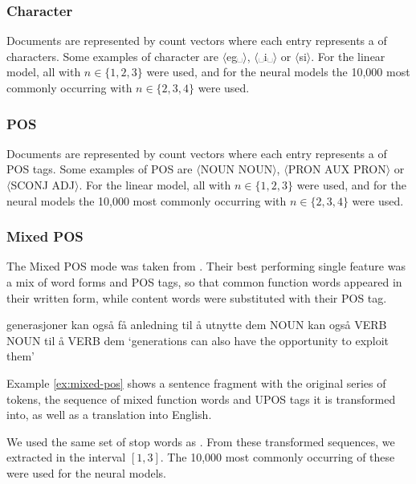 \subsubsection*{Character \ngrams}

Documents are represented by count vectors where each entry represents a
\ngram of characters. Some examples of character \ngrams are
$\langle$eg␣$\rangle$, $\langle$␣i␣$\rangle$ or $\langle$si$\rangle$. For the
linear model, all \ngrams with $n\in \{1,2,3\}$ were used, and for the neural
models the 10,000 most commonly occurring \ngrams with $n\in \{2,3,4\}$ were
used.

\subsubsection*{POS \ngrams}

Documents are represented by count vectors where each entry represents a
\ngram of POS tags. Some examples of POS \ngrams are $\langle$NOUN
NOUN$\rangle$, $\langle$PRON AUX PRON$\rangle$ or $\langle$SCONJ
ADJ$\rangle$. For the linear model, all \ngrams with $n\in \{1,2,3\}$ were
used, and for the neural models the 10,000 most commonly occurring \ngrams
with $n\in \{2,3,4\}$ were used.

\subsubsection*{Mixed POS}

The Mixed POS mode was taken from \textcite{malmasi15}. Their best performing
single feature was a mix of word forms and POS tags, so that common function
words appeared in their written form, while content words were substituted
with their POS tag.

\begin{example}
\gll generasjoner kan også få   anledning til å utnytte dem  
     NOUN         kan også VERB NOUN      til å VERB    dem  
\glt `generations can also have the opportunity to exploit them'
\glend
\label{ex:mixed-pos}
\end{example}

Example \ref{ex:mixed-pos} shows a sentence fragment with the original series
of tokens, the sequence of mixed function words and UPOS tags it is
transformed into, as well as a translation into English.

We used the same set of stop words as \citeauthor{malmasi15}. From these
transformed sequences, we extracted \ngrams in the interval $[1,3]$. The
10,000 most commonly occurring of these were used for the neural models.


